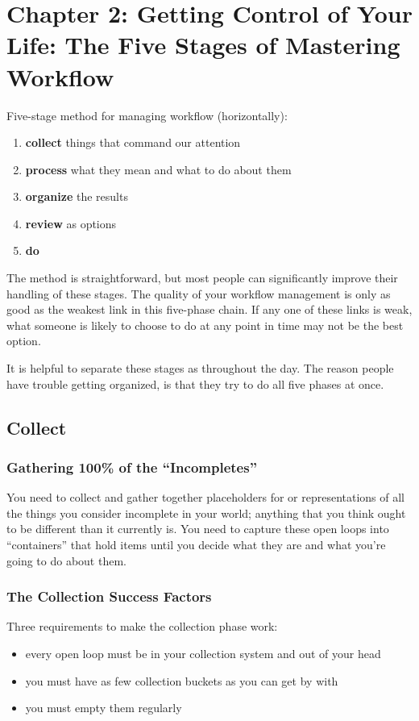 \documentclass[letterpaper]{article}
\newcommand{\p}{\vspace{1em}\par}		%
\begin{document}
\section{Chapter 2: Getting Control of Your Life: The Five Stages of Mastering Workflow}
Five-stage method for managing workflow (horizontally):
\begin{enumerate}
\item \textbf{collect} things that command our attention
\item \textbf{process} what they mean and what to do about them
\item \textbf{organize} the results
\item \textbf{review} as options
\item \textbf{do}
\end{enumerate}
The method is straightforward, but most people can significantly improve their handling of these stages. The quality of your workflow management is only as good as the weakest link in this five-phase chain. If any one of these links is weak, what someone is likely to choose to do at any point in time may not be the best option. 

\p It is helpful to separate these stages as throughout the day. The reason people have trouble getting organized, is that they try to do all five phases at once.

\subsection*{Collect}
\subsubsection*{Gathering 100\% of the ``Incompletes''}
You need to collect and gather together placeholders for or representations of all the things you consider incomplete in your world; anything that you think ought to be different than it currently is. You need to capture these open loops into ``containers'' that hold items until you decide what they are and what you're going to do about them.

\subsubsection*{The Collection Success Factors}
Three requirements to make the collection phase work:
\begin{itemize}
\item every open loop must be in your collection system and out of your head
\item you must have as few collection buckets as you can get by with
\item you must empty them regularly
\end{itemize}
\end{document}
